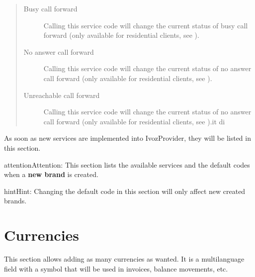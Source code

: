 \documentclass[letterpaper,10pt,english]{sphinxmanual}
\begin{document}
\begin{quote}
\begin{description}
\item[{Busy call forward}] \leavevmode
Calling this service code will change the current status of busy call forward (only available for
residential clients, see {\hyperref[administration_portal/client/residential/residential_devices:residential\string-devices\string-cfw]{}}).

\item[{No answer call forward}] \leavevmode
Calling this service code will change the current status of no answer call forward (only available for
residential clients, see {\hyperref[administration_portal/client/residential/residential_devices:residential\string-devices\string-cfw]{}}).

\item[{Unreachable call forward}] \leavevmode
Calling this service code will change the current status of no answer call forward (only available for
residential clients, see {\hyperref[administration_portal/client/residential/residential_devices:residential\string-devices\string-cfw]{}}).it di

\end{description}
\end{quote}

As soon as new services are implemented into IvozProvider, they will be listed
in this section.

\begin{notice}{attention}{Attention:}
This section lists the available services and the default codes
when a \textbf{new brand} is created.
\end{notice}

\begin{notice}{hint}{Hint:}
Changing the default code in this section will only affect new
created brands.
\end{notice}


\section{Currencies}
\label{administration_portal/platform/currencies:currencies}\label{administration_portal/platform/currencies::doc}
This section allows adding as many currencies as wanted. It is a multilanguage field with a symbol that will be used
in invoices, balance movements, etc.
\end{document}
